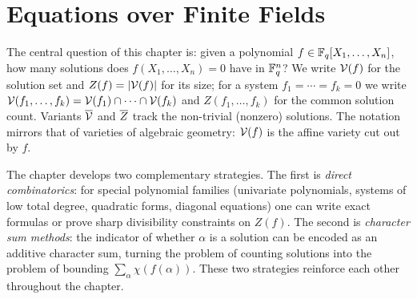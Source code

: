 \chapter{Equations over Finite Fields}

The central question of this chapter is: given a polynomial $f\in\mathbb{F}_q[X_1,\dots,X_n]$, how many solutions does $f(X_1,\dots,X_n)=0$ have in $\mathbb{F}_q^n$? We write $\mathcal{V}(f)$ for the solution set and $Z(f)=|\mathcal{V}(f)|$ for its size; for a system $f_1=\cdots=f_k=0$ we write $\mathcal{V}(f_1,\dots,f_k)=\mathcal{V}(f_1)\cap\cdots\cap\mathcal{V}(f_k)$ and $Z(f_1,\dots,f_k)$ for the common solution count. Variants $\overline{\mathcal{V}}$ and $\overline{Z}$ track the non-trivial (nonzero) solutions. The notation mirrors that of varieties of algebraic geometry: $\mathcal{V}(f)$ is the affine variety cut out by $f$.

The chapter develops two complementary strategies. The first is \emph{direct combinatorics}: for special polynomial families (univariate polynomials, systems of low total degree, quadratic forms, diagonal equations) one can write exact formulas or prove sharp divisibility constraints on $Z(f)$. The second is \emph{character sum methods}: the indicator of whether $\alpha$ is a solution can be encoded as an additive character sum, turning the problem of counting solutions into the problem of bounding $\sum_\alpha\chi(f(\alpha))$. These two strategies reinforce each other throughout the chapter.






